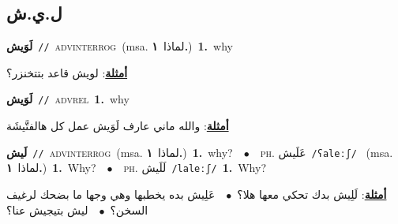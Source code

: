 \documentclass[10pt,a4paper,twoside]{article} %
\begin{document}
\begin{multicols}{2}
\vspace{-3mm}
\subsection*{\color{blue}\foreignlanguage{arabic}{ل.ي.ش}\color{blue}{ (ntws)}} 

{\setlength\topsep{0pt}\textbf{\foreignlanguage{arabic}{لَوَيش}}\ {\color{gray}\texttt{//}\color{black}}\ \textsc{adv\textunderscore interrog}\ \color{gray}(msa. \foreignlanguage{arabic}{لماذا}~\foreignlanguage{arabic}{\textbf{١.}})\color{black}\ \textbf{1.}~why\  \begin{flushright}\color{gray}\foreignlanguage{arabic}{\textbf{\underline{\foreignlanguage{arabic}{أمثلة}}}: لويش قاعد بتتخنزر؟}\end{flushright}\color{black}} \vspace{2mm}

{\setlength\topsep{0pt}\textbf{\foreignlanguage{arabic}{لَوَيش}}\ {\color{gray}\texttt{//}\color{black}}\ \textsc{adv\textunderscore rel}\ \textbf{1.}~why\  \begin{flushright}\color{gray}\foreignlanguage{arabic}{\textbf{\underline{\foreignlanguage{arabic}{أمثلة}}}: والله ماني عارف لَوَيش عمل كل هالفتَّيشَة}\end{flushright}\color{black}} \vspace{2mm}

{\setlength\topsep{0pt}\textbf{\foreignlanguage{arabic}{لَيش}}\ {\color{gray}\texttt{//}\color{black}}\ \textsc{adv\textunderscore interrog}\ \color{gray}(msa. \foreignlanguage{arabic}{لماذا}~\foreignlanguage{arabic}{\textbf{١.}})\color{black}\ \textbf{1.}~why?\ \ $\bullet$\ \ \textsc{ph.} \color{gray} \foreignlanguage{arabic}{عَلَيش}\color{black}\ {\color{gray}\texttt{/{\sffamily ʕaleːʃ}/}\color{black}}\ \color{gray} (msa. \foreignlanguage{arabic}{لماذا}~\foreignlanguage{arabic}{\textbf{١.}})\color{black}\ \textbf{1.}~Why?\ \ $\bullet$\ \ \textsc{ph.} \color{gray} \foreignlanguage{arabic}{لَلَيش}\color{black}\ {\color{gray}\texttt{/{\sffamily laleːʃ}/}\color{black}}\ \textbf{1.}~Why?\  \begin{flushright}\color{gray}\foreignlanguage{arabic}{\textbf{\underline{\foreignlanguage{arabic}{أمثلة}}}: لَلِيش بدك تحكي معها هلا؟\ $\bullet$\ \  عَلِيش بده يخطبها وهي وجها ما بضحك لرغيف السخن؟\ $\bullet$\ \  ليش بتيجيش عنا؟}\end{flushright}\color{black}} \vspace{2mm}


\end{multicols}
\end{document}
